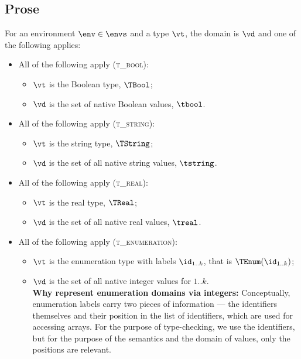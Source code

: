 \subsection{Prose}
For an environment $\env \in \envs$ and a type $\vt$, the domain is $\vd$ and one of the following applies:
\begin{itemize}
  \item All of the following apply (\textsc{t\_bool}):
  \begin{itemize}
    \item $\vt$ is the Boolean type, $\TBool$;
    \item $\vd$ is the set of native Boolean values, $\tbool$.
  \end{itemize}

  \item All of the following apply (\textsc{t\_string}):
  \begin{itemize}
    \item $\vt$ is the string type, $\TString$;
    \item $\vd$ is the set of all native string values, $\tstring$.
  \end{itemize}

  \item All of the following apply (\textsc{t\_real}):
  \begin{itemize}
    \item $\vt$ is the real type, $\TReal$;
    \item $\vd$ is the set of all native real values, $\treal$.
  \end{itemize}

  \item All of the following apply (\textsc{t\_enumeration}):
  \begin{itemize}
    \item $\vt$ is the enumeration type with labels $\id_{1..k}$, that is $\TEnum(\id_{1..k})$;
    \item $\vd$ is the set of all native integer values for $1..k$.\\
    \textbf{Why represent enumeration domains via integers:}
    Conceptually, enumeration labels carry two pieces of information --- the identifiers themselves
    and their position in the list of identifiers, which are used for accessing arrays.
    For the purpose of type-checking, we use the identifiers, but for the purpose of the semantics
    and the domain of values, only the positions are relevant.
  \end{itemize}


\end{itemize}
